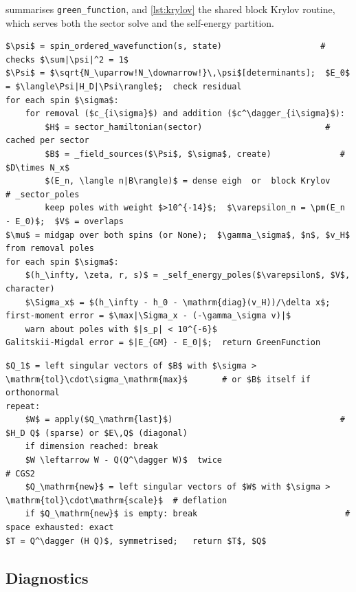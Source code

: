 \documentclass[11pt,a4paper]{article}
\newcommand{\code}[1]{\texttt{#1}}
\begin{document}
 summarises \code{green\_function}, and \cref{lst:krylov} the shared block Krylov routine, which serves both the sector solve and the self-energy partition.

\begin{lstlisting}[style=pseudo,float=tbp,caption={\code{interacting.green\_function} (simplified).},label=lst:green,captionpos=b]
$\psi$ = spin_ordered_wavefunction(s, state)                    # checks $\sum|\psi|^2 = 1$
$\Psi$ = $\sqrt{N_\uparrow!N_\downarrow!}\,\psi$[determinants];  $E_0$ = $\langle\Psi|H_D|\Psi\rangle$;  check residual
for each spin $\sigma$:
    for removal ($c_{i\sigma}$) and addition ($c^\dagger_{i\sigma}$):
        $H$ = sector_hamiltonian(sector)                         # cached per sector
        $B$ = _field_sources($\Psi$, $\sigma$, create)              # $D\times N_x$
        $(E_n, \langle n|B\rangle)$ = dense eigh  or  block Krylov     # _sector_poles
        keep poles with weight $>10^{-14}$;  $\varepsilon_n = \pm(E_n - E_0)$;  $V$ = overlaps
$\mu$ = midgap over both spins (or None);  $\gamma_\sigma$, $n$, $v_H$ from removal poles
for each spin $\sigma$:
    $(h_\infty, \zeta, r, s)$ = _self_energy_poles($\varepsilon$, $V$, character)
    $\Sigma_x$ = $(h_\infty - h_0 - \mathrm{diag}(v_H))/\delta x$;   first-moment error = $\max|\Sigma_x - (-\gamma_\sigma v)|$
    warn about poles with $|s_p| < 10^{-6}$
Galitskii-Migdal error = $|E_{GM} - E_0|$;  return GreenFunction
\end{lstlisting}

\begin{lstlisting}[style=pseudo,float=tbp,caption={\code{interacting.\_block\_krylov(apply, B, max\_dim, tol, scale)}.},label=lst:krylov,captionpos=b]
$Q_1$ = left singular vectors of $B$ with $\sigma > \mathrm{tol}\cdot\sigma_\mathrm{max}$       # or $B$ itself if orthonormal
repeat:
    $W$ = apply($Q_\mathrm{last}$)                                  # $H_D Q$ (sparse) or $E\,Q$ (diagonal)
    if dimension reached: break
    $W \leftarrow W - Q(Q^\dagger W)$  twice                               # CGS2
    $Q_\mathrm{new}$ = left singular vectors of $W$ with $\sigma > \mathrm{tol}\cdot\mathrm{scale}$  # deflation
    if $Q_\mathrm{new}$ is empty: break                              # space exhausted: exact
$T = Q^\dagger (H Q)$, symmetrised;   return $T$, $Q$
\end{lstlisting}

\subsection{Diagnostics}
\end{document}
